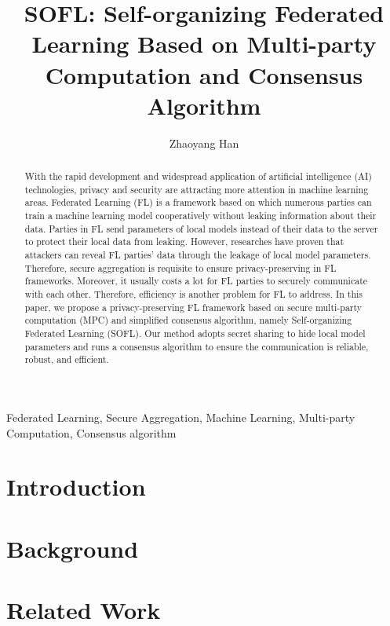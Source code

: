\documentclass[journal]{IEEEtran}
\title {SOFL: Self-organizing Federated Learning Based on Multi-party Computation and Consensus Algorithm}
\author{Zhaoyang Han}
\begin{document}
\maketitle

\begin{abstract}
With the rapid development and widespread application of artificial intelligence (AI) technologies, privacy and security are attracting more attention in machine learning areas. Federated Learning (FL) is a framework based on which numerous parties can train a machine learning model cooperatively without leaking information about their data. Parties in FL send parameters of local models instead of their data to the server to protect their local data from leaking. However, researches have proven that attackers can reveal FL parties' data through the leakage of local model parameters. Therefore, secure aggregation is requisite to ensure privacy-preserving in FL frameworks. Moreover, it usually costs a lot for FL parties to securely communicate with each other. Therefore, efficiency is another problem for FL to address. In this paper, we propose a privacy-preserving FL framework based on secure multi-party computation (MPC) and simplified consensus algorithm, namely Self-organizing Federated Learning (SOFL). Our method adopts secret sharing to hide local model parameters and runs a consensus algorithm to ensure the communication is reliable, robust, and efficient.

\end{abstract}

\begin{IEEEkeywords}
    Federated Learning, Secure Aggregation, Machine Learning, Multi-party Computation, Consensus algorithm
\end{IEEEkeywords}


\section{Introduction} 
\label{sec:intro}


\section{Background}
\label{sec:back}


\section{Related Work}
\label{sec:related}

\end{document}
